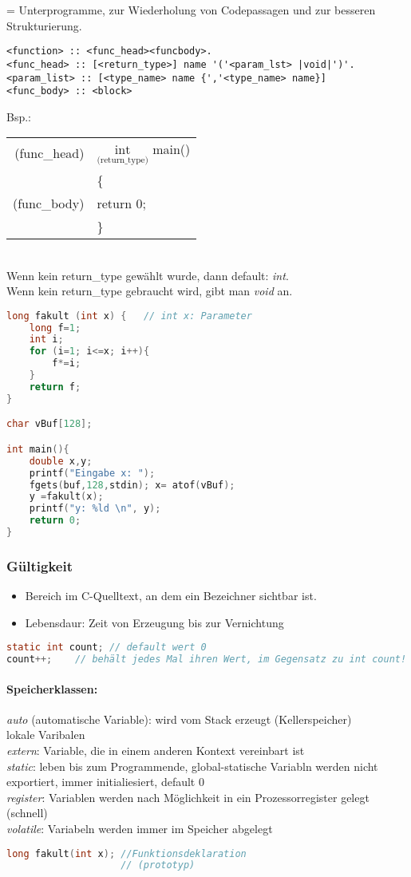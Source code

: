 = Unterprogramme, zur Wiederholung von Codepassagen und zur besseren Strukturierung.
\begin{lstlisting}
<function> :: <func_head><funcbody>.
<func_head> :: [<return_type>] name '('<param_lst> |void|')'.
<param_list> :: [<type_name> name {','<type_name> name}]
<func_body> :: <block>
\end{lstlisting}
Bsp.:\\
\begin{tabular}{r l}
(func\_head) & $\underset{\text{(return\_type)}}{\text{int}}$ main()\\
 & \{ \\
(func\_body) & return 0;\\
& \} \\
\end{tabular}\\
Wenn kein return\_type gewählt wurde, dann default: \emph{int}.\\
Wenn kein return\_type gebraucht wird, gibt man \emph{void} an.
\begin{lstlisting}[language=C]
long fakult (int x) {	// int x: Parameter
	long f=1;
	int i;
	for (i=1; i<=x; i++){
		f*=i;
	}
	return f;
}

char vBuf[128];

int main(){
	double x,y;
	printf("Eingabe x: ");
	fgets(buf,128,stdin); x= atof(vBuf);
	y =fakult(x);
	printf("y: %ld \n", y);
	return 0;
}
\end{lstlisting}

\subsubsection{Gültigkeit}
\begin{itemize}
\item Bereich im C-Quelltext, an dem ein Bezeichner sichtbar ist.
\item Lebensdaur: Zeit von Erzeugung bis zur Vernichtung
\end{itemize}
\begin{lstlisting}[language = C]
static int count; // default wert 0
count++;	// behält jedes Mal ihren Wert, im Gegensatz zu int count!
\end{lstlisting}
\paragraph{Speicherklassen:}\parskp
\emph{auto} (automatische Variable): wird vom Stack erzeugt (Kellerspeicher)\\
lokale Varibalen\\
\emph{extern}: Variable, die in einem anderen Kontext vereinbart ist\\
\emph{static}: leben bis zum Programmende, global-statische Variabln werden nicht exportiert, immer initialiesiert, default 0\\
\emph{register}: Variablen werden nach Möglichkeit in ein Prozessorregister gelegt (schnell)\\
\emph{volatile}: Variabeln werden immer im Speicher abgelegt
\begin{lstlisting}[language=C]
long fakult(int x);	//Funktionsdeklaration
					// (prototyp)
\end{lstlisting}

